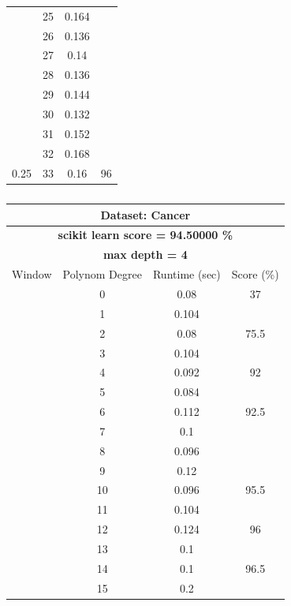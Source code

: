 \documentclass{article}
\begin{document}
\begin{multicols}{2}
\begin{table}[H]
\begin{tabular}{|c|c|c|c|}
 & 25 & 0.164 &  \\ \cline{2-3}
 & 26 & 0.136 &  \\ \cline{2-3}
 & 27 & 0.14 &  \\ \cline{2-3}
 & 28 & 0.136 &  \\ \cline{2-3}
 & 29 & 0.144 &  \\ \cline{2-3}
 & 30 & 0.132 &  \\ \cline{2-3}
 & 31 & 0.152 &  \\ \cline{2-3}
 & 32 & 0.168 &  \\ \cline{2-3}
\multirow{-34}{*}{0.25} & 33 & 0.16 & \multirow{-9}{*}{96} \\ \hline
\end{tabular}
\end{table}

\begin{table}[H]
\caption{}
\label{tab:my-table}
\begin{tabular}{|c|c|c|c|}
\hline
\multicolumn{4}{|c|}{Dataset: Cancer} \\ \hline
\multicolumn{4}{|c|}{\textbf{scikit learn score = 94.50000  \%}} \\ \hline
\multicolumn{4}{|c|}{\textbf{max depth = 4}} \\ \hline
Window & Polynom Degree & Runtime (sec) & Score (\%) \\ \hline
 & 0 & 0.08 & 37 \\ \cline{2-4} 
 & 1 & 0.104 &  \\ \cline{2-3}
 & 2 & 0.08 & \multirow{-2}{*}{75.5} \\ \cline{2-4} 
 & 3 & 0.104 &  \\ \cline{2-3}
 & 4 & 0.092 & \multirow{-2}{*}{92} \\ \cline{2-4} 
 & 5 & 0.084 &  \\ \cline{2-3}
 & 6 & 0.112 & \multirow{-2}{*}{92.5} \\ \cline{2-4} 
 & 7 & 0.1 &  \\ \cline{2-3}
 & 8 & 0.096 &  \\ \cline{2-3}
 & 9 & 0.12 &  \\ \cline{2-3}
 & 10 & 0.096 & \multirow{-4}{*}{95.5} \\ \cline{2-4} 
 & 11 & 0.104 &  \\ \cline{2-3}
 & 12 & 0.124 & \multirow{-2}{*}{96} \\ \cline{2-4} 
 & 13 & 0.1 &  \\ \cline{2-3}
 & 14 & 0.1 & \multirow{-2}{*}{96.5} \\ \cline{2-4} 
 & \cellcolor[HTML]{FFFFC7}15 & \cellcolor[HTML]{FFFFC7}0.2 & \cellcolor[HTML]{FFFFC7} \\ \cline{2-3}

\end{tabular}
\end{table}
\end{multicols}
\end{document}
